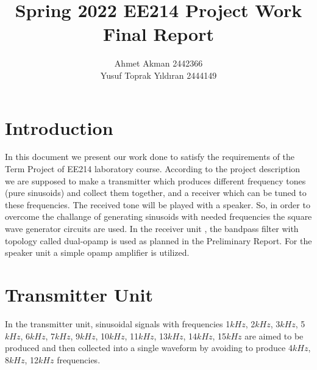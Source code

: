 \documentclass[letterpaper,12pt]{article}
\begin{document}
\thispagestyle{empty}

\title{ \vspace{-2cm} Spring 2022 EE214 Project Work  \protect\\ Final Report\vspace{-4mm}}
\author{ Ahmet Akman 2442366 \protect\\ Yusuf Toprak Yıldıran 2444149 }
\date{}
\maketitle
\section{Introduction}
In this document we present our work done to satisfy the requirements of the Term Project of EE214 laboratory course. According to the project description we are supposed to make a transmitter which produces different frequency tones (pure sinusoids) and collect them together, and a receiver which can be tuned to these frequencies. The received tone will be played with a speaker.
So, in order to overcome the challange of generating sinusoids with needed frequencies the square wave generator circuits are used. In the receiver unit , the bandpass filter with topology called dual-opamp is used as planned in the Preliminary Report. For the speaker unit a simple opamp amplifier is utilized. 

\section{Transmitter Unit}
In the transmitter unit, sinusoidal signals with frequencies 1\(kHz\), 2\(kHz\), 3\(kHz\), 5\(kHz\), 6\(kHz\), 7\(kHz\), 9\(kHz\), 10\(kHz\), 11\(kHz\), 13\(kHz\), 14\(kHz\), 15\(kHz\) are aimed to be produced and then collected into a single waveform by avoiding to produce 4\(kHz\), 8\(kHz\), 12\(kHz\) frequencies. 
\end{document}
